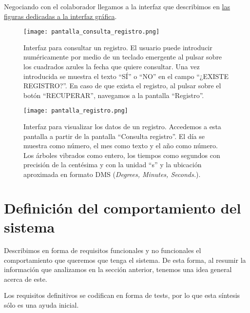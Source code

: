 Negociando con el colaborador llegamos a la interfaz que describimos
en \hyperref[fig:interfaz_gráfica]{las figuras dedicadas a la interfaz
gráfica}.

\begin{figure}[!b]
    \begin{minipage}[b]{0.48\textwidth}
        \texttt{[image: pantalla\_consulta\_registro.png]}
        \caption{Interfaz para consultar un registro. El usuario puede
        introducir numéricamente por medio de un teclado emergente al pulsar
        sobre los cuadrados azules la fecha que quiere consultar. Una vez
        introducida se muestra el texto ``SÍ'' o ``NO'' en el campo ``¿EXISTE REGISTRO?''.
        En caso de que exista el registro, al pulsar sobre el botón ``RECUPERAR'',
        navegamos a la pantalla ``Registro''.}
    \end{minipage}
    \hfill
    \begin{minipage}[b]{0.48\textwidth}
        \texttt{[image: pantalla\_registro.png]}
        \caption{Interfaz para visualizar los datos de un registro. Accedemos
        a esta pantalla a partir de la pantalla ``Consulta registro''. El día
        se muestra como número, el mes como texto y el año como número.
        Los árboles vibrados como entero, los tiempos como segundos con 
        precisión de la centésima y con la unidad ``s'' y la ubicación
        aproximada en formato DMS (\textit{\textit{Degrees, Minutes, Seconds.}}).}
    \end{minipage}
    \label{fig:interfaz_gráfica}
\end{figure}

\section{Definición del comportamiento del sistema}

Describimos en forma de requisitos funcionales y no funcionales el
comportamiento que queremos que tenga el sistema. De esta forma, al resumir
la información que analizamos en la sección anterior, tenemos una
idea general acerca de este.

Los requisitos definitivos se codifican en forma de tests, por lo que
esta síntesis sólo es una ayuda inicial.


